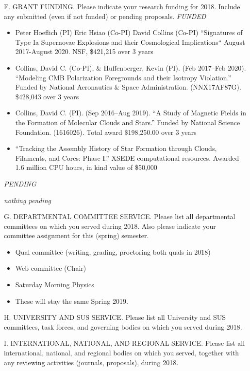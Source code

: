 %

\noindent F. GRANT FUNDING. Please indicate your research funding
for 2018. Include any submitted  (even if not funded) or pending
proposals.
%
\noindent\emph{FUNDED}

\begin{itemize}
    \item Peter Hoeflich (PI) Eric Hsiao (Co-PI) David Collins (Co-PI)
``Signatures of Type Ia Supernovae Explosions and their Cosmological
Implications`` August 2017-August 2020. NSF, \$421,215 over 3 years

\item Collins, David C. (Co-PI), \& Huffenberger, Kevin (PI). (Feb 2017–Feb 2020).
``Modeling CMB Polarization Foregrounds and their Isotropy Violation.'' Funded
by National Aeronautics \& Space Administration. (NNX17AF87G). \$428,043 over 3
years

\item Collins, David C. (PI). (Sep 2016–Aug 2019). ``A Study of Magnetic Fields
in the Formation of Molecular Clouds and Stars.'' Funded by National
Science Foundation. (1616026). Total award \$198,250.00 over 3 years

\item ``Tracking the Assembly History of Star Formation through Clouds, Filaments, and
Cores: Phase I.'' XSEDE computational resources.  Awarded 1.6 million CPU hours,
in kind value of \$50,000
\end{itemize}

\noindent\emph{PENDING}

\emph{nothing pending}

\noindent G. DEPARTMENTAL COMMITTEE SERVICE. Please list all
departmental committees on which you served during 2018.  Also
please indicate your committee assignment for this (spring)
semester.
%
\begin{itemize}
\item Qual committee (writing, grading, proctoring both quals in 2018)
\item Web committee (Chair)
\item Saturday Morning Physics
\item These will stay the same Spring 2019.
\end{itemize}

\noindent H. UNIVERSITY AND SUS SERVICE. Please list all University
and SUS committees, task forces, and governing bodies on which you
served during 2018.
\bigskip
%

\noindent I. INTERNATIONAL, NATIONAL, AND REGIONAL  SERVICE. Please
list all international, national, and regional bodies on which you
served, together with any reviewing activities (journals,
proposals), during 2018.

